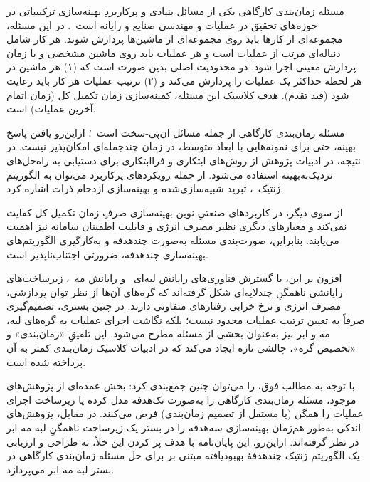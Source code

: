 

مسئله زمان‌بندی کارگاهی
یکی از مسائل بنیادی و پرکاربردِ بهینه‌سازی ترکیبیاتی
در حوزه‌های تحقیق در عملیات
و مهندسی صنایع و رایانه است~\cite{pinedo2016scheduling}.
در این مسئله، مجموعه‌ای از کارها باید روی مجموعه‌ای از ماشین‌ها پردازش شوند.
هر کار شامل دنباله‌ای مرتب از عملیات است
و هر عملیات باید روی ماشین مشخصی و با زمان پردازش معینی اجرا شود.
دو محدودیت اصلی بدین صورت است که
(۱) هر ماشین در هر لحظه حداکثر یک عملیات را پردازش می‌کند
و (۲) ترتیب عملیات هر کار باید رعایت شود (قید تقدم).
هدف کلاسیک این مسئله، کمینه‌سازی زمان تکمیل کل
(زمان اتمام آخرین عملیات) است.

مسئله زمان‌بندی کارگاهی از جمله مسائل ان‌پی-سخت است~\cite{garey1976complexity}؛
ازاین‌رو یافتن پاسخ بهینه، حتی برای نمونه‌هایی با ابعاد متوسط، در زمان چندجمله‌ای امکان‌پذیر نیست.
در نتیجه، در ادبیات پژوهش از روش‌های ابتکاری
و فراابتکاری برای دستیابی به راه‌حل‌های نزدیک‌به‌بهینه استفاده می‌شود.
از جمله رویکردهای پرکاربرد می‌توان به الگوریتم ژنتیک~\cite{goldberg1989genetic}،
تبرید شبیه‌سازی‌شده
و بهینه‌سازی ازدحام ذرات اشاره کرد.

از سوی دیگر، در کاربردهای صنعتیِ نوین
بهینه‌سازی صرفِ زمان تکمیل کل کفایت نمی‌کند
و معیارهای دیگری نظیر مصرف انرژی
و قابلیت اطمینان سامانه نیز اهمیت می‌یابند.
بنابراین، صورت‌بندی مسئله به‌صورت چندهدفه
و به‌کارگیری الگوریتم‌های بهینه‌سازی چندهدفه، ضرورتی اجتناب‌ناپذیر است.

افزون بر این، با گسترش فناوری‌های
رایانش لبه‌ای~\cite{shi2016edge}
و رایانش مه~\cite{bonomi2012fog}،
زیرساخت‌های رایانشی ناهمگنِ چندلایه‌ای شکل گرفته‌اند
که گره‌های آن‌ها از نظر توان پردازشی، مصرف انرژی و نرخ خرابی
رفتارهای متفاوتی دارند.
در چنین بستری، تصمیم‌گیری صرفاً به تعیین ترتیب عملیات محدود نیست؛
بلکه نگاشت اجرای عملیات به گره‌های لبه، مه و ابر نیز
به‌عنوان بخشی از مسئله مطرح می‌شود.
این تلفیقِ «زمان‌بندی» و «تخصیص گره»، چالشی تازه ایجاد می‌کند
که در ادبیات کلاسیک زمان‌بندی کمتر به آن پرداخته شده است.

با توجه به مطالب فوق،  را می‌توان چنین جمع‌بندی کرد:
بخش عمده‌ای از پژوهش‌های موجود، مسئله زمان‌بندی کارگاهی را به‌صورت تک‌هدفه مدل کرده
یا زیرساخت اجرای عملیات را همگن (یا مستقل از تصمیم زمان‌بندی) فرض می‌کنند.
در مقابل، پژوهش‌های اندکی به‌طور هم‌زمان
بهینه‌سازی سه‌هدفه را در بستر یک زیرساخت ناهمگنِ لبه-مه-ابر
در نظر گرفته‌اند.
ازاین‌رو، این پایان‌نامه با هدف پر کردن این خلأ،
به طراحی و ارزیابی یک الگوریتم ژنتیک چندهدفهٔ بهبودیافته
مبتنی بر 
برای حل مسئله زمان‌بندی کارگاهی در بستر لبه-مه-ابر می‌پردازد.


